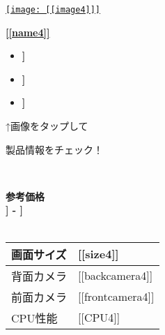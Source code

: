 \documentclass[lualatex,paper=a4,airticle]{jlreq}
\begin{document}
\vspace{1cm} %

\begin{minipage}[b][0.43\textheight][t]{\textwidth}
  \begin{minipage}{0.23\textwidth}
    \href{[[url4]]}{\texttt{[image: [[image4]]]}}
  \end{minipage}%
  \hfill
  \begin{minipage}{0.77\textwidth}
    \href{[[lurl4]]}{\huge{\textbf{[[name4]]}}}\par
    \begin{itemize}
      \item {\color{Purple}\mcfamily\bfseries\myfont [[description41]]}
      \item {\color{Purple}\mcfamily\bfseries\myfont [[description42]]}
      \item {\color{Purple}\mcfamily\bfseries\myfont [[description43]]}
    \end{itemize}
  \end{minipage}
  \vspace{-1\baselineskip}
  \begin{multicols}{2}
    \begin{spacing}{0.5}
      {\qquad↑画像をタップして \par \qquad 製品情報をチェック！}\\
    \end{spacing}
    {\color{red}\textbf{参考価格}}\\
    {\LARGE\color{red}\textbf{\textyen [[lprice4]] - \textyen [[hprice4]]}}\\
    \\
    \begin{minipage}{0.75\columnwidth}
      \begin{tabular}{l p{4.5cm}}
        \hline
        画面サイズ & [[size4]] \\
        \hline
        背面カメラ & [[backcamera4]] \\
        \hline
        前面カメラ & [[frontcamera4]] \\
        \hline
        CPU性能 & [[CPU4]] \\
        \hline
      \end{tabular}
    \end{minipage}
    \columnbreak


\end{multicols}
\end{minipage}
\end{document}
